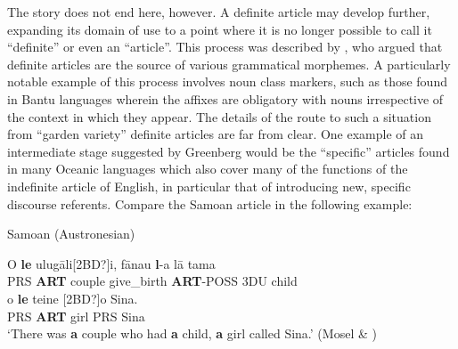 
The story does not end here, however. A definite article may develop further, expanding its domain of use to a point where it is no longer possible to call it “definite” or even an “article”. This process was described by \citet{Greenberg1978}, who argued that definite articles are the source of various grammatical morphemes.  A particularly notable example of this process involves noun class markers, such  as those found in Bantu languages wherein the affixes are obligatory with nouns irrespective of the context in which they appear. The details of the route to such a situation from “garden variety” definite articles are far from clear. One example of an intermediate stage suggested by Greenberg would be the “specific” articles found in many Oceanic languages which also cover many of the functions of the indefinite article of English, in particular that of introducing new, specific discourse referents. Compare the Samoan article  in the following example: 


\item 

Samoan (Austronesian)



 \ea\label{}
\gll [2BD?]O  \textbf{le} ulug\=ali[2BD?]i,  f\=anau  \textbf{l}{}-a  l\=a  tama\\


PRS  \textbf{ART} couple  give\_birth  \textbf{ART}{}-POSS  3DU  child\\

 \ea\label{}
\gll [2BD?]o  \textbf{le} teine  [2BD?]o  Sina.\\


PRS  \textbf{ART} girl  PRS  Sina\\

\glt ‘There was \textbf{a} couple who had \textbf{a} child, \textbf{a} girl called Sina.’ (Mosel \& \citet[259]{Hovdhaugen1992})

\z

